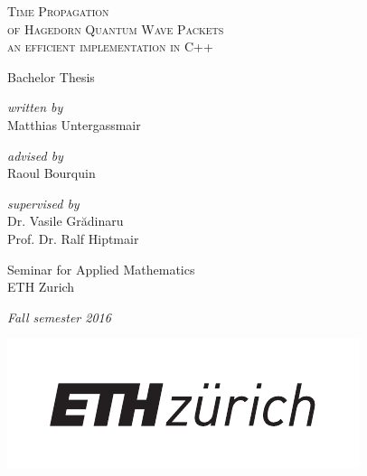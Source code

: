 \begin{titlepage}
	\begin{center}

		\hfill

		\vspace{2cm}

		{\Large \textsc{Time Propagation\\ of Hagedorn Quantum Wave Packets\\[5pt]}}
		{\large \textsc{an efficient implementation in C++}}

		\vspace{1cm}

		{\large{Bachelor Thesis}}

		\vspace{1cm}

		{\emph{written by}} \\
		{
			Matthias Untergassmair
		}

		\vspace{1cm}

		{\emph{advised by}} \\
		{
			Raoul Bourquin
		}

		\vspace{1cm}

		{\emph{supervised by}} \\
		{
			Dr. Vasile Gr\u{a}dinaru\\
			Prof. Dr. Ralf Hiptmair
		}
		
		\vfill

		Seminar for Applied Mathematics\\
		ETH Zurich

		\vspace{.5cm}

		\emph{{Fall semester 2016}}

		\vspace{.5cm}

		\includegraphics[width=0.5\linewidth]{figures/eth-logo.pdf}

	\end{center}

\end{titlepage}
